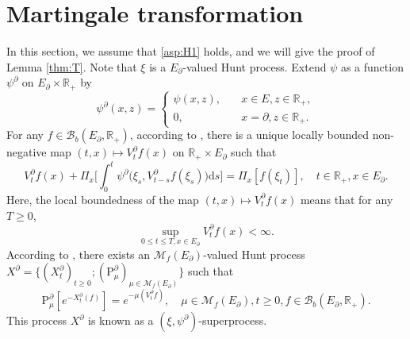 \documentclass[12pt,a4paper]{amsart}
\numberwithin{equation}{section}
\theoremstyle{plain}
\theoremstyle{definition}
\theoremstyle{remark}
\begin{document}
\section{Martingale transformation} \label{sec:T}
	In this section, we assume that \eqref{asp:H1} holds, and we will give the proof of Lemma \ref{thm:T}.
	Note that $\xi$ is a $E_\partial$-valued Hunt process.
	Extend $\psi$ as a function $ \psi^\partial$ on $E_\partial \times \mathbb R_+$ by
\[
	\psi^\partial(x, z) = \begin{cases}
	\psi(x,z), &\quad x \in E, z\in \mathbb R_+,
	\\ 0, &\quad x=\partial, z\in \mathbb R_+.
	\end{cases}
\]
	For any $f \in \mathcal B_b(E_\partial,\mathbb R_+)$,  according to \cite[Proposition 2.20]{Li2011Measure-valued}, there is a unique locally bounded non-negative map $(t,x)\mapsto V^\partial_tf(x)$ on $\mathbb R_+\times E_\partial$ such that
\begin{equation}
	V_t^\partial f(x) + \Pi_x\Big[\int_0^t \psi^\partial\big(\xi_s, V^\partial_{t-s} f(\xi_s)\big) {\mathrm d}s\Big]
	= \Pi_x[f(\xi_t)],
	\quad t\in \mathbb R_+, x\in E_\partial.
\end{equation}
	Here, the local boundedness of the map $(t,x) \mapsto V_t^\partial f(x)$ means that  for any $T\geq 0$,
\[
	\sup_{0\leq t\leq T, x\in E_\partial} V^\partial_tf(x) < \infty.
\]
	According to \cite[Proposition 2.21 and Theorem 5.11]{Li2011Measure-valued}, there exists an $\mathcal M_f(E_\partial)$-valued Hunt process $X^\partial =\{(X^\partial_t)_{t\geq 0}; (\mathrm P^\partial_\mu)_{\mu \in \mathcal M_f(E_\partial)}\}$ such that
\begin{equation}
	\mathrm P^\partial_\mu[e^{- X^\partial_t(f)}]
	= e^{- \mu(V^\partial_tf)},
	\quad \mu\in \mathcal M_f(E_\partial), t\geq 0, f \in \mathcal B_b(E_\partial,\mathbb R_+).
\end{equation}
	This process $X^\partial$ is known as a $(\xi, \psi^\partial)$-superprocess.
\end{document}
